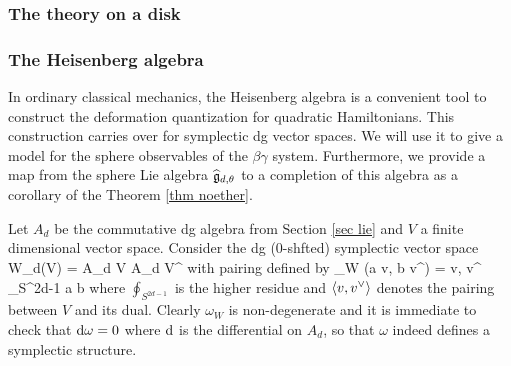 

\subsubsection{The theory on a disk}

\subsubsection{The Heisenberg algebra}

In ordinary classical mechanics, the Heisenberg algebra is a convenient tool to construct the deformation quantization for quadratic Hamiltonians.
This construction carries over for symplectic dg vector spaces.
We will use it to give a model for the sphere observables of the $\beta\gamma$ system.
Furthermore, we provide a map from the sphere Lie algebra $\widehat{\mathfrak g}_{d, \theta}$ to a completion of this algebra as a corollary of the Theorem \ref{thm noether}.

Let $A_d$ be the commutative dg algebra from Section \ref{sec lie} and $V$ a finite dimensional vector space. 
Consider the dg (0-shfted) symplectic vector space
\ben
W_d(V) = A_d \tensor V \oplus A_d \tensor V^\vee [d-1]
\een
with pairing defined by
\ben
\omega_W (a \tensor v, b \tensor v^\vee) = \<v, v^\vee\> \oint_{S^{2d-1}} a \wedge b 
\een
where $\oint_{S^{2d-1}}$ is the higher residue and $\langle v,v^\vee\rangle$ denotes the pairing between $V$ and its dual. 
Clearly $\omega_W$ is non-degenerate and it is immediate to check that ${\rm d} \omega = 0$ where ${\rm d}$ is the differential on $A_d$, so that $\omega$ indeed defines a symplectic structure. 



